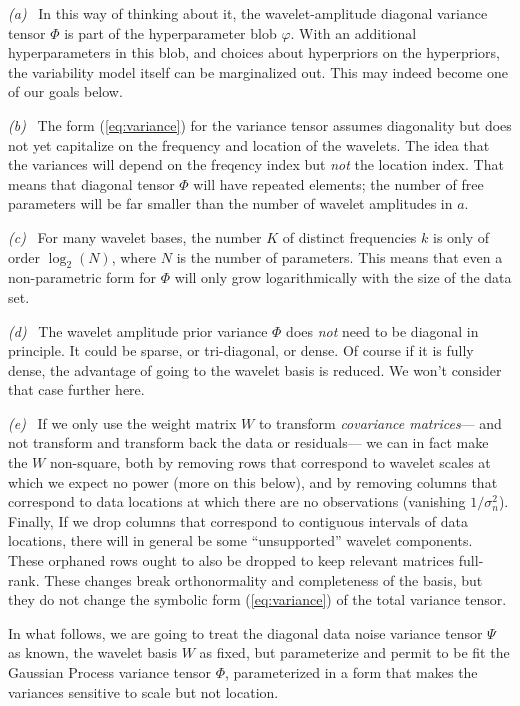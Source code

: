 \documentclass[12pt,letterpaper]{article}
\newcommand{\variance}{\sigma^2}
\newcommand{\hyperpars}{\varphi}
\newcommand{\wavevec}{a}
\newcommand{\noisetensor}{\Psi}
\newcommand{\wavetensor}{\Phi}
\newcommand{\weightmatrix}{W}
\begin{document}
\textsl{(a)}~%
In this way of thinking about it, the wavelet-amplitude diagonal
variance tensor $\wavetensor$ is part of the hyperparameter blob
$\hyperpars$.
With an additional hyperparameters in this blob,
and choices about hyperpriors on the hyperpriors,
the variability model itself can be marginalized out.
This may indeed become one of our goals below.

\textsl{(b)}~%
The form (\ref{eq:variance}) for the variance tensor assumes diagonality
but does not yet capitalize on the frequency and location of the wavelets.
The idea that the variances will depend on the freqency index but \emph{not} the location index.
That means that diagonal tensor $\wavetensor$ will have repeated elements; the number of
free parameters will be far smaller than the number of wavelet amplitudes in $\wavevec$.

\textsl{(c)}~%
For many wavelet bases, the number $K$ of distinct frequencies $k$ is only of order $\log_2(N)$,
where $N$ is the number of parameters.
This means that even a non-parametric form for $\wavetensor$
will only grow logarithmically with the size of the data set.

\textsl{(d)}~%
The wavelet amplitude prior variance $\wavetensor$ does \emph{not} need to be diagonal in principle.
It could be sparse, or tri-diagonal, or dense.
Of course if it is fully dense, the advantage of going to the wavelet basis is reduced.
We won't consider that case further here.

\textsl{(e)}~%
If we only use the weight matrix $\weightmatrix$ to transform \emph{covariance matrices}---%
and not transform and transform back the data or residuals---%
we can in fact make the $\weightmatrix$ non-square,
both by removing rows that correspond to wavelet scales at which we expect no power
(more on this below),
and by removing columns that correspond to data locations at which there are no observations
(vanishing $1/\variance_n$).
Finally, If we drop columns that correspond to contiguous intervals of data locations,
there will in general be some ``unsupported'' wavelet components.
These orphaned rows ought to also be dropped to keep relevant matrices full-rank.
These changes break orthonormality and completeness of the basis,
but they do not change the symbolic form (\ref{eq:variance}) of the total variance tensor.

In what follows,
we are going to treat the diagonal data noise variance tensor $\noisetensor$ as known,
the wavelet basis $\weightmatrix$ as fixed,
but parameterize and permit to be fit the Gaussian Process variance tensor $\wavetensor$,
parameterized in a form that makes the variances sensitive to scale but not location.
\end{document}
